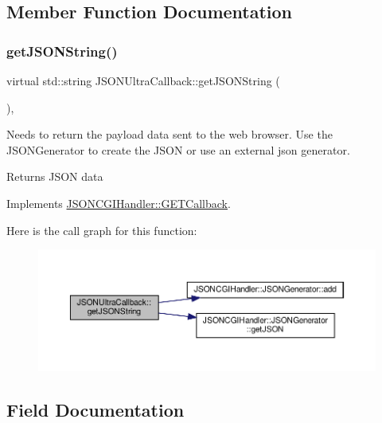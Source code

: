 \subsection{Member Function Documentation}
\mbox{\label{classJSONUltraCallback_abb097f82255b74c56370b90bc06d81da}} 
\subsubsection{\texorpdfstring{get\+J\+S\+O\+N\+String()}{getJSONString()}}
{\footnotesize\ttfamily virtual std\+::string J\+S\+O\+N\+Ultra\+Callback\+::get\+J\+S\+O\+N\+String (\begin{DoxyParamCaption}{ }\end{DoxyParamCaption})\hspace{0.3cm}{\ttfamily [inline]}, {\ttfamily [virtual]}}

Needs to return the payload data sent to the web browser. Use the J\+S\+O\+N\+Generator to create the J\+S\+ON or use an external json generator. \begin{DoxyReturn}{Returns}
J\+S\+ON data 
\end{DoxyReturn}


Implements \hyperlink{classJSONCGIHandler_1_1GETCallback_a2367bf5a5912e9e5599ee464e0846255}{J\+S\+O\+N\+C\+G\+I\+Handler\+::\+G\+E\+T\+Callback}.

Here is the call graph for this function\+:
\nopagebreak
\begin{figure}[H]
\begin{center}
\leavevmode
\includegraphics[width=350pt]{classJSONUltraCallback_abb097f82255b74c56370b90bc06d81da_cgraph}
\end{center}
\end{figure}


\subsection{Field Documentation}
\mbox{\label{classJSONUltraCallback_aed520f877003033dff14d7bd636683dc}} 
